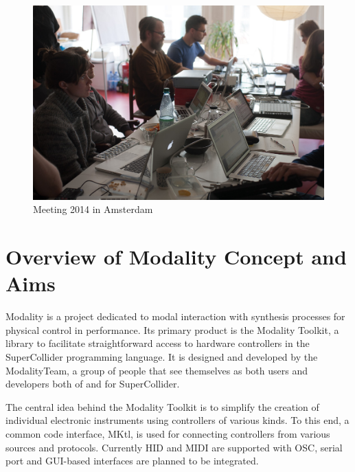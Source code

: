 \documentclass{article}
\title{\papertitle}
\begin{document}
%
\capstartfalse
\maketitle
\capstarttrue
%
\begin{abstract}
\end{abstract}

\begin{figure}[h]
	\centering
		\includegraphics[width=.9\columnwidth]{../media/20140331-IMG_5976.jpg}
	\caption{Meeting 2014 in Amsterdam}
	\label{fig:media_20140331-IMG_5976}
\end{figure}

\section{Overview of Modality Concept and Aims}
\label{sec:overview_of_modality_concept_and_aims}

Modality is a project dedicated to modal interaction with synthesis processes for physical control in performance. Its primary product is the Modality Toolkit, a library to facilitate straightforward access to hardware controllers in the SuperCollider programming language. It is designed and developed by the ModalityTeam, a group of people that see themselves as both users and developers both of and for SuperCollider.

The central idea behind the Modality Toolkit is to simplify the creation of individual electronic instruments using controllers of various kinds. To this end, a common code interface, MKtl, is used for connecting controllers from various sources and protocols. Currently HID and MIDI are supported with OSC, serial port and GUI-based interfaces are planned to be integrated.
\end{document}
